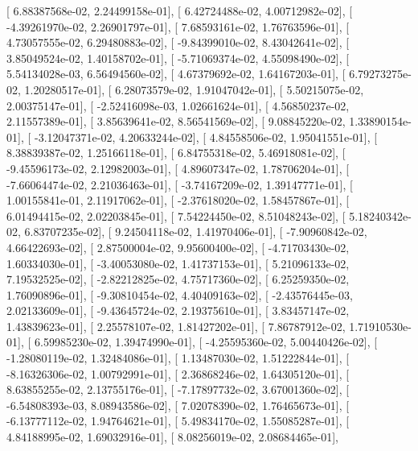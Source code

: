\documentclass{article}
\begin{document}
       [  6.88387568e-02,   2.24499158e-01],
       [  6.42724488e-02,   4.00712982e-02],
       [ -4.39261970e-02,   2.26901797e-01],
       [  7.68593161e-02,   1.76763596e-01],
       [  4.73057555e-02,   6.29480883e-02],
       [ -9.84399010e-02,   8.43042641e-02],
       [  3.85049524e-02,   1.40158702e-01],
       [ -5.71069374e-02,   4.55098490e-02],
       [  5.54134028e-03,   6.56494560e-02],
       [  4.67379692e-02,   1.64167203e-01],
       [  6.79273275e-02,   1.20280517e-01],
       [  6.28073579e-02,   1.91047042e-01],
       [  5.50215075e-02,   2.00375147e-01],
       [ -2.52416098e-03,   1.02661624e-01],
       [  4.56850237e-02,   2.11557389e-01],
       [  3.85639641e-02,   8.56541569e-02],
       [  9.08845220e-02,   1.33890154e-01],
       [ -3.12047371e-02,   4.20633244e-02],
       [  4.84558506e-02,   1.95041551e-01],
       [  8.38839387e-02,   1.25166118e-01],
       [  6.84755318e-02,   5.46918081e-02],
       [ -9.45596173e-02,   2.12982003e-01],
       [  4.89607347e-02,   1.78706204e-01],
       [ -7.66064474e-02,   2.21036463e-01],
       [ -3.74167209e-02,   1.39147771e-01],
       [  1.00155841e-01,   2.11917062e-01],
       [ -2.37618020e-02,   1.58457867e-01],
       [  6.01494415e-02,   2.02203845e-01],
       [  7.54224450e-02,   8.51048243e-02],
       [  5.18240342e-02,   6.83707235e-02],
       [  9.24504118e-02,   1.41970406e-01],
       [ -7.90960842e-02,   4.66422693e-02],
       [  2.87500004e-02,   9.95600400e-02],
       [ -4.71703430e-02,   1.60334030e-01],
       [ -3.40053080e-02,   1.41737153e-01],
       [  5.21096133e-02,   7.19532525e-02],
       [ -2.82212825e-02,   4.75717360e-02],
       [  6.25259350e-02,   1.76090896e-01],
       [ -9.30810454e-02,   4.40409163e-02],
       [ -2.43576445e-03,   2.02133609e-01],
       [ -9.43645724e-02,   2.19375610e-01],
       [  3.83457147e-02,   1.43839623e-01],
       [  2.25578107e-02,   1.81427202e-01],
       [  7.86787912e-02,   1.71910530e-01],
       [  6.59985230e-02,   1.39474990e-01],
       [ -4.25595360e-02,   5.00440426e-02],
       [ -1.28080119e-02,   1.32484086e-01],
       [  1.13487030e-02,   1.51222844e-01],
       [ -8.16326306e-02,   1.00792991e-01],
       [  2.36868246e-02,   1.64305120e-01],
       [  8.63855255e-02,   2.13755176e-01],
       [ -7.17897732e-02,   3.67001360e-02],
       [ -6.54808393e-03,   8.08943586e-02],
       [  7.02078390e-02,   1.76465673e-01],
       [ -6.13777112e-02,   1.94764621e-01],
       [  5.49834170e-02,   1.55085287e-01],
       [  4.84188995e-02,   1.69032916e-01],
       [  8.08256019e-02,   2.08684465e-01],
\end{document}
